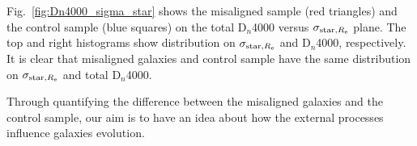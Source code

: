 Fig.~\ref{fig:Dn4000_sigma_star} shows the misaligned sample (red triangles) and the control sample (blue squares) on the total D$_n$4000 versus $\sigma_{{\rm star}, R_{\rm e}}$ plane. The top and right histograms show distribution on $\sigma_{{\rm star}, R_{\rm e}}$ and D$_n$4000, respectively. It is clear that misaligned galaxies and control sample have the same distribution on $\sigma_{{\rm star}, R_{\rm e}}$ and total D$_n$4000.

Through quantifying the difference between the misaligned galaxies and the control sample, our aim is to have an idea about how the external processes influence galaxies evolution. 
